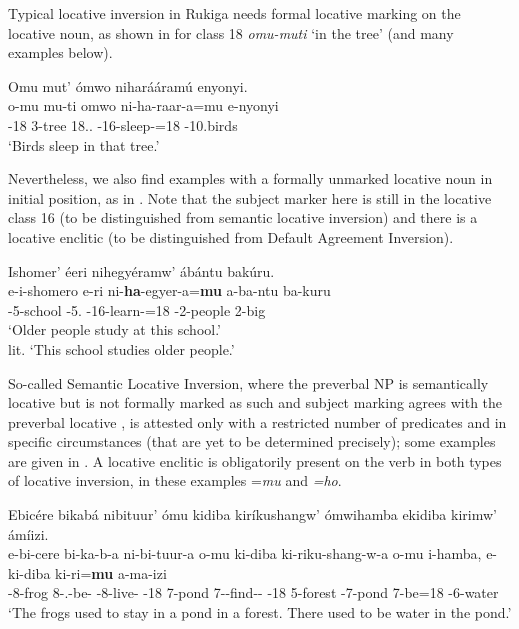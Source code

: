 \documentclass[output=paper]{langscibook}
\begin{document}
 \citep[144]{Asiimwe2014}
\z

Typical locative inversion in Rukiga needs formal locative marking on the locative noun, as shown in  for class 18 \textit{omu-muti} ‘in the tree’ (and many examples below). 

\ea
\label{bkm:Ref135655452}
Omu mut’ ómwo niharááramú enyonyi.\\
\gll
o-mu  mu-ti  omwo  ni-ha-raar-a=mu  e-nyonyi\\
\AUG{}-18  3-tree  18.\DEM{}.\MED{}  \IPFV{}-16\SM{}-sleep-\FV{}=18  \AUG{}-10.birds\\
\glt
‘Birds sleep in that tree.’\\


\z


Nevertheless, we also find examples with a formally unmarked locative noun in initial position, as in . Note that the subject marker here is still in the locative class 16 (to be distinguished from semantic locative inversion) and there is a locative enclitic (to be distinguished from Default Agreement Inversion). 


\ea
\label{bkm:Ref116293261}
Ishomer’ éeri nihegyéramw’ ábántu bakúru.\\
\gll
e-i-shomero  e-ri  ni-\textbf{ha}-egyer-a=\textbf{mu}  a-ba-ntu  ba-kuru\\
\AUG{}-5-school  \DEM{}-5.\PROX{}  \IPFV{}-{}16\SM{}-learn-\FV{}=18  \AUG{}-2-people  2-big\\
\glt
‘Older people study at this school.’\\
lit. ‘This school studies older people.’


\z


So-called Semantic Locative Inversion, where the preverbal NP is semantically locative but is not formally marked as such and subject marking agrees with the preverbal locative \citep{MartenvanderWal2014,Buell2007}, is attested only with a restricted number of predicates and in specific circumstances (that are yet to be determined precisely); some examples are given in . A locative enclitic is obligatorily present on the verb in both types of locative inversion, in these examples =\textit{mu} and \textit{=ho}.

\ea
\label{bkm:Ref116293263}
Ebicére bikabá nibituur’ ómu kidiba kiríkushangw’ ómwihamba ekidiba kirimw’ ámíizi.\\
\gll
e-bi-cere  bi-ka-b-a  ni-bi-tuur-a  o-mu  ki-diba  ki-riku-shang-w-a   o-mu  i-hamba,  e-ki-diba  ki-ri=\textbf{mu}  a-ma-izi \\
\AUG{}-8-frog  8\SM{}-\F{}.\PST{}-be-\FV{}  \IPFV{}-8\SM{}-live-\FV{}  \AUG{}-18  7-pond  7\RM{}-\IPFV{}-find-\PASS{}-\FV{}   \AUG{}-18  5-forest  \AUG{}-7-pond  7\SM{}-{}be=18  \AUG{}-6-water \\
\glt
`The frogs used to stay in a pond in a forest. There used to be water in the pond.’\\
\end{document}
